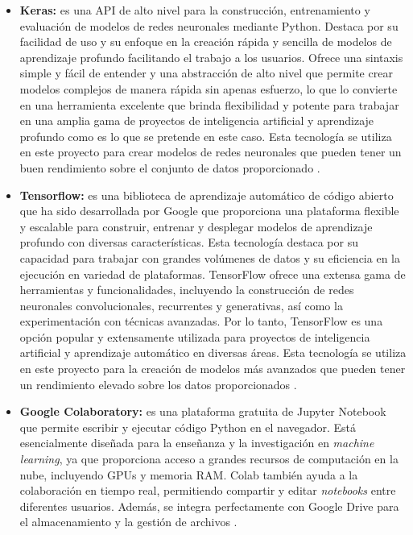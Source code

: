 \begin{itemize}
  \item \textbf{Keras:}
  es una API de alto nivel para la construcción, entrenamiento y evaluación de modelos de redes neuronales mediante Python. Destaca por su facilidad de uso y su enfoque en la creación rápida y sencilla de modelos de aprendizaje profundo facilitando el trabajo a los usuarios. Ofrece una sintaxis simple y fácil de entender y una abstracción de alto nivel que permite crear modelos complejos de manera rápida sin apenas esfuerzo, lo que lo convierte en una herramienta excelente que brinda flexibilidad y potente para trabajar en una amplia gama de proyectos de inteligencia artificial y aprendizaje profundo como es lo que se pretende en este caso. Esta tecnología se utiliza en este proyecto para crear modelos de redes neuronales que pueden tener un buen rendimiento sobre el conjunto de datos proporcionado \cite{keras}.

  \item \textbf{Tensorflow:}
  es una biblioteca de aprendizaje automático de código abierto que ha sido desarrollada por Google que proporciona una plataforma flexible y escalable para construir, entrenar y desplegar modelos de aprendizaje profundo con diversas características. Esta tecnología destaca por su capacidad para trabajar con grandes volúmenes de datos y su eficiencia en la ejecución en variedad de plataformas. TensorFlow ofrece una extensa gama de herramientas y funcionalidades, incluyendo la construcción de redes neuronales convolucionales, recurrentes y generativas, así como la experimentación con técnicas avanzadas. Por lo tanto, TensorFlow es una opción popular y extensamente utilizada para proyectos de inteligencia artificial y aprendizaje automático en diversas áreas. Esta tecnología se utiliza en este proyecto para la creación de modelos más avanzados que pueden tener un rendimiento elevado sobre los datos proporcionados \cite{tensorflow}.

  \item \textbf{Google Colaboratory:}
  es una plataforma gratuita de Jupyter Notebook que permite escribir y ejecutar código Python en el navegador. Está esencialmente diseñada para la enseñanza y la investigación en \textit{machine learning}, ya que proporciona acceso a grandes recursos de computación en la nube, incluyendo GPUs y memoria RAM. Colab también ayuda a la colaboración en tiempo real, permitiendo compartir y editar \textit{notebooks} entre diferentes usuarios. Además, se integra perfectamente con Google Drive para el almacenamiento y la gestión de archivos \cite{google-colab}.
  
  
  \end{itemize}
